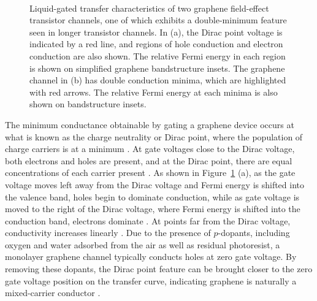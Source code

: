 \documentclass[
  a4paper,
]{scrbook}
\begin{document}
\begin{figure}
\begin{minipage}[t]{0.45\linewidth}
{{}

}

\end{minipage}%
%
\begin{minipage}[t]{0.01\linewidth}

{\centering 

~

}

\end{minipage}%

\caption[Liquid-gated transfer characteristics of two graphene
field-effect transistor channels, one of which exhibits a double-minimum
feature seen in longer transistor
channels.]{\label{fig-graphene-characteristics}Liquid-gated transfer
characteristics of two graphene field-effect transistor channels, one of
which exhibits a double-minimum feature seen in longer transistor
channels. In (a), the Dirac point voltage is indicated by a red line,
and regions of hole conduction and electron conduction are also shown.
The relative Fermi energy in each region is shown on simplified graphene
bandstructure insets. The graphene channel in (b) has double conduction
minima, which are highlighted with red arrows. The relative Fermi energy
at each minima is also shown on bandstructure insets.}

\end{figure}

The minimum conductance obtainable by gating a graphene device occurs at
what is known as the charge neutrality or Dirac point, where the
population of charge carriers is at a minimum
\autocite{Novoselov2004,Bartolomeo2011,Ohno2015,Kireev2017}. At gate
voltages close to the Dirac voltage, both electrons and holes are
present, and at the Dirac point, there are equal concentrations of each
carrier present \autocite{Novoselov2004,Bartolomeo2011,Peng2018}. As
shown in Figure~\ref{fig-graphene-characteristics} (a), as the gate
voltage moves left away from the Dirac voltage and Fermi energy is
shifted into the valence band, holes begin to dominate conduction, while
as gate voltage is moved to the right of the Dirac voltage, where Fermi
energy is shifted into the conduction band, electrons dominate
\autocite{Novoselov2004,Bartolomeo2011,Feng2014,Zhang2015}. At points
far from the Dirac voltage, conductivity increases linearly
\autocite{Novoselov2004,Bartolomeo2011,Peng2018}. Due to the presence of
\(p\)-dopants, including oxygen and water adsorbed from the air as well
as residual photoresist, a monolayer graphene channel typically conducts
holes at zero gate voltage. By removing these dopants, the Dirac point
feature can be brought closer to the zero gate voltage position on the
transfer curve, indicating graphene is naturally a mixed-carrier
conductor
\autocite{Novoselov2004,Bartolomeo2011,Zhang2015,Kireev2017,Peng2018}.
\end{document}
